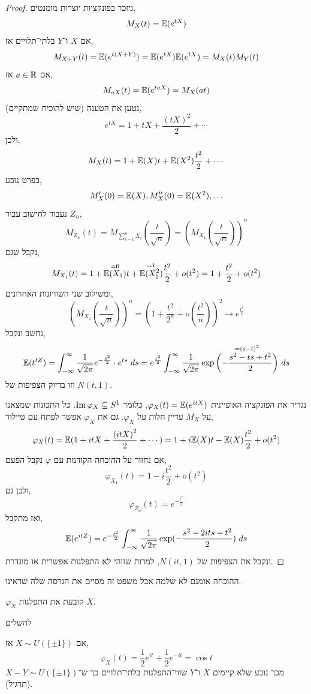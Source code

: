 \begin{proof}
	ניזכר בפונקציות יוצרות מומנטים,
	\[
		M_X(t)
		= \mathbb{E}(e^{t X})
	\]
	אם $X$ ו־$Y$ בלתי־תלויים אז,
	\[
		M_{X + Y}(t)
		= \mathbb{E}(e^{t(X + Y)})
		= \mathbb{E}(e^{t X}) \mathbb{E}(e^{t X})
		= M_X(t) M_Y(t)
	\]
	אם $a \in \mathbb{R}$ אז,
	\[
		M_{a X}(t)
		= \mathbb{E}(e^{t a X})
		= M_X(a t)
	\]
	נטען את הטענה (שיש להוכיח שמתקיים),
	\[
		e^{t X}
		= 1 + t X + \frac{{(t X)}^2}{2} + \cdots
	\]
	ולכן,
	\[
		M_X(t)
		= 1 + \mathbb{E}(X) t + \mathbb{E}(X^2) \frac{t^2}{2} +\cdots
	\]
	בפרט נובע,
	\[
		M_X'(0)
		= \mathbb{E}(X),
		M_X''(0) = \mathbb{E}(X^2),
		\ldots
	\]
	נעבור לחישוב עבור $Z_n$,
	\[
		M_{Z_n}(t)
		= M_{\sum_{i = 1}^n X_i}(\frac{t}{\sqrt{n}})
		= {\left(M_{X_1}\left(\frac{t}{\sqrt{n}}\right)\right)}^n
	\]
	נקבל שגם,
	\[
		M_{X_1}(t)
		= 1 + \overset{= 0}{\mathbb{E}(X_1)} t + \overset{= 1}{\mathbb{E}(X_1^2)} \frac{t^2}{2} + o(t^2)
		= 1 + \frac{t^2}{2} + o(t^2)
	\]
	ומשילוב שני השוויונות האחרונים,
	\[
		{\left(M_{X_1}\left(\frac{t}{\sqrt{n}}\right)\right)}^n
		= {\left(1 + \frac{t^2}{2^n} + o\left(\frac{t^2}{n}\right)\right)}^2
		\to e^{\frac{t^2}{2}}
	\]
	נחשב ונקבל,
	\[
		\mathbb{E}(t^{t Z})
		= \int_{-\infty}^{\infty} \frac{1}{\sqrt{2 \pi}} e^{-\frac{s^2}{2}} \cdot e^{ts}\ ds
		= e^{\frac{t^2}{2}} \int_{-\infty}^{\infty} \frac{1}{\sqrt{2 \pi}} \exp\overset{= {(s - t)}^2}{\left(-\frac{s^2 - ts + t^2}{2}\right)}\ ds
	\]
	וזו בדיוק הצפיפות של $N(t, 1)$.

	נגדיר את הפונקציה האופיינית $\varphi_X(t) = \mathbb{E}(e^{it X})$, כלומר $\operatorname{Im} \varphi_X \subseteq S^1$.
	כל התכונות שמצאנו על $M_X$ עדיין חלות על $\varphi_X$.
	גם את $\varphi_X$ אפשר לפתח עם טיילור,
	\[
		\varphi_X(t)
		= \mathbb{E}(1 + i t X + \frac{{(i t X)}^2}{2} + \cdots)
		= 1 + i \mathbb{E}(X) t - \mathbb{E}(X) \frac{t^2}{2} + o(t^2)
	\]
	אם נחזור על ההוכחה הקודמת עם $\varphi$ נקבל הפעם,
	\[
		\varphi_{X_1}(t)
		= 1 - i \frac{t^2}{2} + o(t^2)
	\]
	ולכן גם,
	\[
		\varphi_{Z_n}(t)
		= e^{-\frac{t^2}{2}}
	\]
	ואז מתקבל,
	\[
		\mathbb{E}(e^{it Z})
		= e^{-\frac{t^2}{2}} \int_{-\infty}^{\infty} \frac{1}{\sqrt{2 \pi}} \exp(-\frac{s^2 - 2i ts - t^2}{2})\ ds
	\]
	ונקבל את הצפיפות של $N(it, 1)$, למרות שזוהי לא התפלגות אפשרית או מוגדרת.
\end{proof}
ההוכחה אומנם לא שלמה אבל משפט זה מסיים את הגרסה שלה שראינו.
\begin{theorem}
	$\varphi_X$ קובעת את התפלגות $X$.
\end{theorem}
\begin{theorem}
	להשלים
\end{theorem}
\begin{example}
	אם $X \sim U(\{ \pm 1 \})$ אז,
	\[
		\varphi_X(t)
		= \frac{1}{2} e^{it} + \frac{1}{2} e^{-it}
		= \cos t
	\]
	מכך נובע שלא קיימים $X$ ו־$Y$ שווי־התפלגות בלתי־תלויים כך ש־$X - Y \sim U(\{ \pm 1 \})$ (תרגיל).
\end{example}
